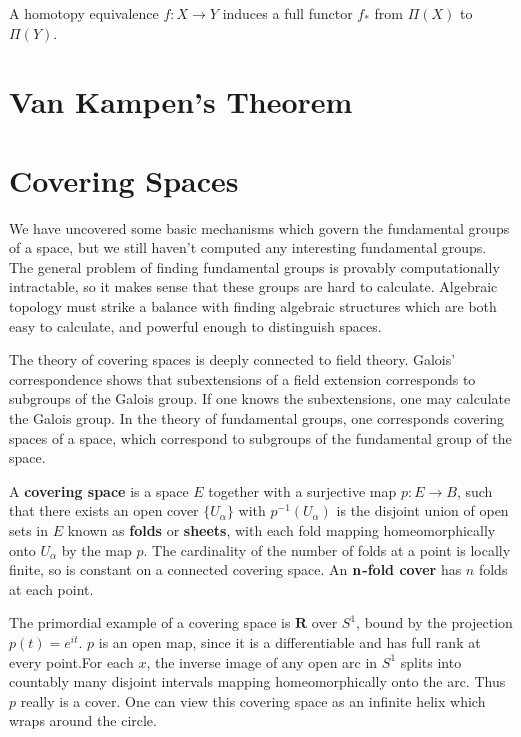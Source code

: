 \begin{corollary}
    A homotopy equivalence $f:X \to Y$ induces a full functor $f_*$ from $\Pi(X)$ to $\Pi(Y)$.
\end{corollary}




\section{Van Kampen's Theorem}




\section{Covering Spaces}

We have uncovered some basic mechanisms which govern the fundamental groups of a space, but we still haven't computed any interesting fundamental groups. The general problem of finding fundamental groups is provably computationally intractable, so it makes sense that these groups are hard to calculate. Algebraic topology must strike a balance with finding algebraic structures which are both easy to calculate, and powerful enough to distinguish spaces.

The theory of covering spaces is deeply connected to field theory. Galois' correspondence shows that subextensions of a field extension corresponds to subgroups of the Galois group. If one knows the subextensions, one may calculate the Galois group. In the theory of fundamental groups, one corresponds covering spaces of a space, which correspond to subgroups of the fundamental group of the space.

A {\bf covering space} is a space $E$ together with a surjective map $p: E \to B$, such that there exists an open cover $\{ U_\alpha \}$ with $p^{-1}(U_\alpha)$ is the disjoint union of open sets in $E$ known as {\bf folds} or {\bf sheets}, with each fold mapping homeomorphically onto $U_\alpha$ by the map $p$. The cardinality of the number of folds at a point is locally finite, so is constant on a connected covering space. An {\bf $\bf{n}$-fold cover} has $n$ folds at each point.

\begin{example}
    The primordial example of a covering space is $\mathbf{R}$ over $S^1$, bound by the projection $p(t) = e^{it}$. $p$ is an open map, since it is a differentiable and has full rank at every point.For each $x$, the inverse image of any open arc in $S^1$ splits into countably many disjoint intervals mapping homeomorphically onto the arc. Thus $p$ really is a cover. One can view this covering space as an infinite helix which wraps around the circle.
\end{example}

